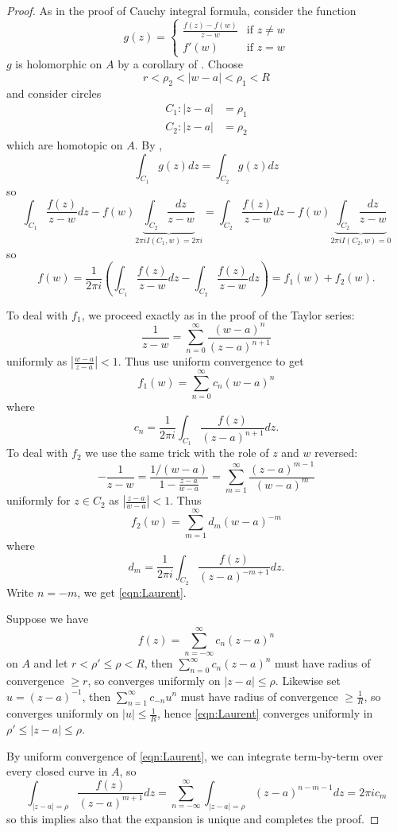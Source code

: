 \documentclass[a4paper]{article}
\begin{document}
\begin{proof}
  As in the proof of Cauchy integral formula, consider the function
  \[
    g(z) =
    \begin{cases}
      \frac{f(z) - f(w)}{z - w} & \text{if } z \neq w \\
      f'(w) & \text{if } z = w
    \end{cases}
  \]
  \(g\) is holomorphic on \(A\) by a corollary of . Choose
  \[
    r < \rho_2 < |w - a| < \rho_1 < R
  \]
  and consider circles
  \begin{align*}
    C_1: |z - a| &= \rho_1 \\
    C_2: |z - a| &= \rho_2
  \end{align*}
  which are homotopic on \(A\). By ,
  \[
    \int_{C_1} g(z) dz = \int_{C_2} g(z) dz
  \]
  so
  \[
    \int_{C_1} \frac{f(z)}{z - w} dz - f(w) \underbrace{\int_{C_2} \frac{dz}{z - w}}_{2\pi i I(C_1, w) = 2\pi i}
    = \int_{C_2} \frac{f(z)}{z - w} dz - f(w) \underbrace{\int_{C_2} \frac{dz}{z - w}}_{2\pi i I(C_2, w) = 0}
  \]
  so
  \[
    f(w)
    = \frac{1}{2\pi i} \left( \int_{C_1} \frac{f(z)}{z - w} dz - \int_{C_2} \frac{f(z)}{z - w} dz \right)
    = f_1(w) + f_2(w).
  \]

  To deal with \(f_1\), we proceed exactly as in the proof of the Taylor series:
  \[
    \frac{1}{z - w}
    = \sum_{n = 0}^\infty \frac{(w - a)^n}{(z - a)^{n + 1}}
  \]
  uniformly as \(\left| \frac{w - a}{z - a} \right| < 1\). Thus use uniform convergence to get
  \[
    f_1(w) = \sum_{n = 0}^\infty c_n(w - a)^n
  \]
  where
  \[
    c_n = \frac{1}{2\pi i} \int_{C_1} \frac{f(z)}{(z - a)^{n + 1}} dz.
  \]
  To deal with \(f_2\) we use the same trick with the role of \(z\) and \(w\) reversed:
  \[
    -\frac{1}{z - w}
    = \frac{1/(w - a)}{1 - \frac{z - a}{w - a}}
    = \sum_{m = 1}^\infty \frac{(z - a)^{m - 1}}{(w - a)^m}
  \]
  uniformly for \(z \in C_2\) as \(\left| \frac{z - a}{w - a} \right| < 1\). Thus
  \[
    f_2(w) = \sum_{m = 1}^\infty d_m (w - a)^{-m}
  \]
  where
  \[
    d_m = \frac{1}{2\pi i} \int_{C_2} \frac{f(z)}{(z - a)^{-m + 1}} dz.
  \]
  Write \(n = -m\), we get \eqref{eqn:Laurent}.

  Suppose we have
  \[
    f(z) = \sum_{n = -\infty}^\infty c_n(z - a)^n
  \]
  on \(A\) and let \(r < \rho' \leq \rho < R\), then \(\sum_{n = 0}^\infty c_n(z - a)^n\) must have radius of convergence \(\geq r\), so converges uniformly on \(|z - a| \leq \rho\). Likewise set \(u = (z - a)^{-1}\), then \(\sum_{n = 1}^\infty c_{-n}u^n\) must have radius of convergence \(\geq \frac{1}{R}\), so converges uniformly on \(|u| \leq \frac{1}{R}\), hence \eqref{eqn:Laurent} converges uniformly in \(\rho' \leq |z - a| \leq \rho\).

  By uniform convergence of \eqref{eqn:Laurent}, we can integrate term-by-term over every closed curve in \(A\), so
  \[
    \int_{|z - a| = \rho} \frac{f(z)}{(z - a)^{m + 1}} dz
    = \sum_{n = -\infty}^\infty \int_{|z - a| = \rho} (z - a)^{n - m - 1} dz
    = 2\pi i c_m
  \]
  so this implies also that the expansion is unique and completes the proof.
\end{proof}
\end{document}
